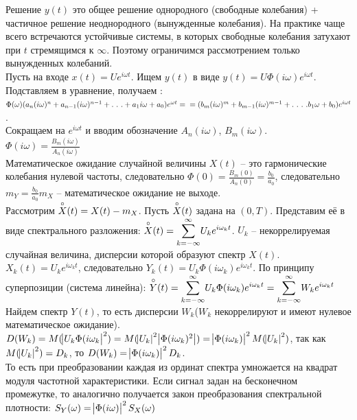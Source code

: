 \documentclass[russian, 12pt, fleqn]{article}
\begin{document}
Решение $y(t)$  это  общее решение однородного (свободные колебания) + частичное решение неоднородного (вынужденные колебания). На практике чаще всего встречаются устойчивые системы, в которых свободные колебания затухают при $t$ стремящимся к $\infty$. Поэтому ограничимся рассмотрением только вынужденных колебаний.\\
Пусть на входе $x(t) = Ue^{i \omega t}$. Ищем $y(t)$ в виде $y(t) = U \Phi(i\omega) e^{i\omega t}$. Подставляем в уравнение, получаем : 
$\Phi(\omega) (a_n (i\omega)^n + a_{n-1} (i\omega)^{n-1} + .\ .\ . + a_1i\omega + a_0)e^{\omega t}  = \\ = (b_m(i\omega)^m  + b_{m - 1}(i\omega)^{m-1}  + .\ .\ .\ . b_1\omega + b_0) e^{i\omega t}$.\\
Сокращаем на $e^{i\omega t}$ и вводим обозначение $A_n(i\omega)$, $B_m(i\omega)$.\\
$\Phi(i\omega)= \frac{B_m(i\omega)}{A_n(i\omega)}$\\
Математическое ожидание случайной величины $X(t)$ -- это гармонические колебания нулевой частоты, следовательно $\Phi(0) = \frac{B_m(0)}{A_n(0)} = \frac{b_0}{a_0}$, следовательно $m_Y = \frac{b_0}{a_0}m_X$ -- математическое ожидание не выходе.\\
Рассмотрим $\displaystyle{\buildrel\circ\over X}(t) =  X(t) - m_X$. Пусть $\displaystyle{\buildrel\circ\over X}(t)$ задана на $(0, T)$. Представим её в виде спектрального разложения: $\displaystyle{\buildrel\circ\over X}(t) = \displaystyle{\sum \limits _{k  = - \infty} ^ {\infty}} U_k e^{i \omega_k t}$. $U_k$ -- некоррелируемая случайная величина, дисперсии которой образуют спектр $X(t)$. $X_k(t) = U_k e^{i\omega_k t}$, следовательно $Y_k(t) = U_k \Phi(i\omega_k) e^{i \omega_k t}$. По принципу суперпозиции (система линейна): $\displaystyle{\buildrel\circ\over Y}(t)=   \displaystyle{\sum \limits_{k = -\infty}^{\infty}} U_k \Phi(i\omega_k) e^{i\omega_k t} = \displaystyle{\sum \limits _{k  = - \infty} ^ {\infty}} W_k e^{i \omega_k t}$\\
Найдем спектр $Y(t)$, то есть дисперсии $W_k$($W_k$ некоррелируют и имеют нулевое математическое ожидание).\\
$D(W_k) = M(\abs{U_k \Phi(i\omega_k }^2 ) =  M(\abs{U_k}^2 \abs{\Phi(i\omega_k )^2 } ) = \abs{\Phi(i \omega_k)}^2 M(\abs{U_k}^2)$, так как $M(\abs{U_k}^2) = D_k$, то $D(W_k) = \abs{\Phi(i\omega_k)}^2 D_k$.\\
То есть при преобразовании каждая из ординат спектра умножается на квадрат модуля частотной характеристики. Если сигнал задан на бесконечном промежутке, то аналогично получается закон преобразования спектральной плотности: $S_Y(\omega) = \abs{\Phi(i\omega)}^2 S_X(\omega)$\\
\end{document}
